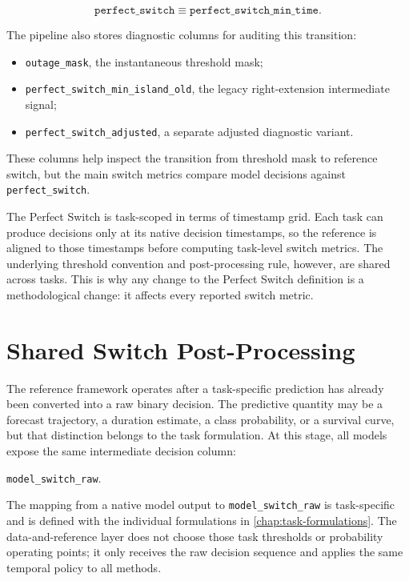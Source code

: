 \[
  \texttt{perfect\_switch} \equiv \texttt{perfect\_switch\_min\_time}.
\]

The pipeline also stores diagnostic columns for auditing this transition:

\begin{itemize}
  \item \texttt{outage\_mask}, the instantaneous threshold mask;
  \item \texttt{perfect\_switch\_min\_island\_old}, the legacy right-extension
  intermediate signal;
  \item \texttt{perfect\_switch\_adjusted}, a separate adjusted diagnostic
  variant.
\end{itemize}

These columns help inspect the transition from threshold mask to reference
switch, but the main switch metrics compare model decisions against
\texttt{perfect\_switch}.

The Perfect Switch is task-scoped in terms of timestamp grid. Each task can
produce decisions only at its native decision timestamps, so the reference is
aligned to those timestamps before computing task-level switch metrics. The
underlying threshold convention and post-processing rule, however, are shared
across tasks. This is why any change to the Perfect Switch definition is a
methodological change: it affects every reported switch metric.

\section{Shared Switch Post-Processing}
\label{sec:shared-switch-post-processing}

The reference framework operates after a task-specific prediction has already
been converted into a raw binary decision. The predictive quantity may be a
forecast trajectory, a duration estimate, a class probability, or a survival
curve, but that distinction belongs to the task formulation. At this stage, all
models expose the same intermediate decision column:

\begin{center}
\texttt{model\_switch\_raw}.
\end{center}

The mapping from a native model output to \texttt{model\_switch\_raw} is
task-specific and is defined with the individual formulations in
\cref{chap:task-formulations}. The data-and-reference layer does not choose
those task thresholds or probability operating points; it only receives the raw
decision sequence and applies the same temporal policy to all methods.

